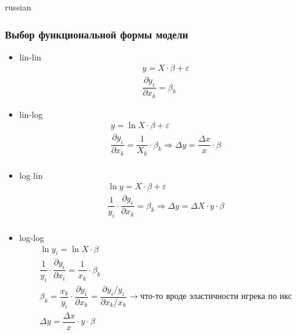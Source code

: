 \documentclass{article}
\begin{document}
\begin{otherlanguage*}{russian}
\subsubsection*{Выбор функциональной формы модели}
\begin{itemize}
\item lin-lin 
\begin{align*}
y = X \cdot \beta  + \varepsilon \\
\dfrac{\partial y_i}{\partial x_k} = \beta_k 
\end{align*}
\item lin-log 
\begin{align*}
y = \ln X \cdot \beta + \varepsilon \\
\dfrac{\partial y_i}{\partial x_k} = \dfrac{1}{X_k} \cdot \beta_k \Rightarrow \Delta y =  \dfrac{\Delta x}{x} \cdot \beta  \\
\end{align*}
\item log lin 
\begin{align*}
\ln y = X \cdot \beta + \varepsilon \\ 
\dfrac{1}{y_i} \cdot \dfrac{\partial y_i}{\partial x_k} = \beta_k \Rightarrow \Delta y = \Delta X \cdot y \cdot \beta \\
\end{align*}
\item log-log 
\begin{align*}
\ln y_i = \ln X \cdot \beta \\
\dfrac{1}{y_i} \cdot \dfrac{\partial y_i}{\partial x_i} = \dfrac{1}{x_k} \cdot \beta_k \\
\beta_k = \dfrac{x_k}{y_i} \cdot \dfrac{\partial y_i}{\partial x_k} = \dfrac{\partial y_i / y_i}{\partial x_k / x_k } \rightarrow \text{что-то вроде эластичности игрека по икс} \\
\Delta y = \dfrac{\Delta x}{x} \cdot y \cdot \beta  
\end{align*}
\end{itemize}
\end{otherlanguage*} 
\end{document}
